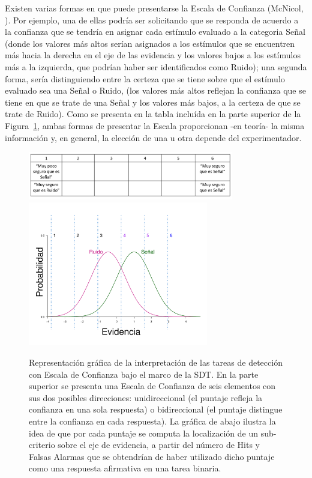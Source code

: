 \begin{itemize}
Existen varias formas en que puede presentarse la Escala de Confianza (McNicol, \citeyear{McNicol2}). Por ejemplo, una de ellas podría ser solicitando que se responda de acuerdo a la confianza que se tendría en asignar cada estímulo evaluado a la categoria Señal (donde los valores más altos serían asignados a los estímulos que se encuentren más hacia la derecha en el eje de las evidencia y los valores bajos a los estímulos más a la izquierda, que podrían haber ser identificados como Ruido); una segunda forma, sería distinguiendo entre la certeza que se tiene sobre que el estímulo evaluado sea una Señal o Ruido, (los valores más altos reflejan la confianza que se tiene en que se trate de una Señal y los valores más bajos, a la certeza de que se trate de Ruido). Como se presenta en la tabla incluída en la parte superior de la Figura~\ref{fig:Conf_Rat}, ambas formas de presentar la Escala proporcionan -en teoría- la misma información y, en general, la elección de una u otra depende del experimentador.\\

\begin{figure}[th]
\centering
\includegraphics[width=0.80\textwidth]{Figures/Puntajes_Criterios}\\
\includegraphics[width=0.70\textwidth]{Figures/ConfidenceRating}\\
\caption[Representación gráfica de la interpretación de las tareas de detección con Escala de Confianza]{Representación gráfica de la interpretación de las tareas de detección con Escala de Confianza bajo el marco de la SDT. En la parte superior se presenta una Escala de Confianza de seis elementos con sus dos posibles direcciones: unidireccional (el puntaje refleja la confianza en una sola respuesta) o bidireccional (el puntaje distingue entre la confianza en cada respuesta). La gráfica de abajo ilustra la idea de que por cada puntaje se computa la localización de un sub-criterio sobre el eje de evidencia, a partir del número de Hits y Falsas Alarmas que se obtendrían de haber utilizado dicho puntaje como una respuesta afirmativa en una tarea binaria.}
\label{fig:Conf_Rat}
\end{figure}


\end{itemize}
